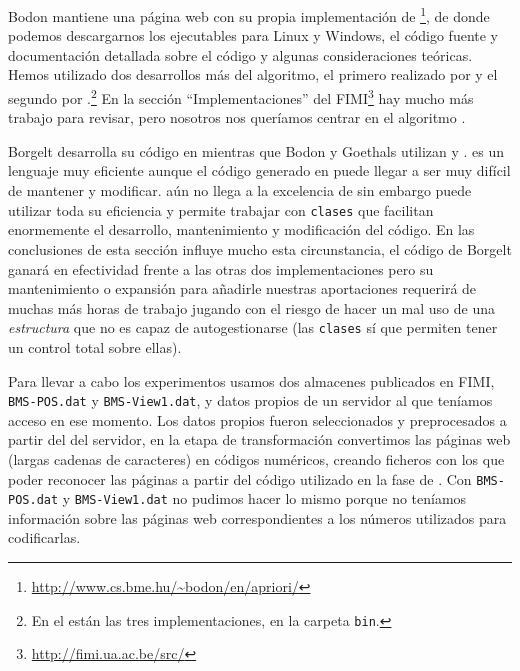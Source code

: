 Bodon mantiene una página web con su propia implementación de \apriori\footnote{\url{http://www.cs.bme.hu/~bodon/en/apriori/}}, de donde podemos descargarnos los ejecutables para Linux y Windows, el código fuente y documentación detallada sobre el código y algunas consideraciones teóricas. Hemos utilizado dos desarrollos más del algoritmo, el primero realizado por  y el segundo por .\footnote{En el \dvdAdjunto están las tres implementaciones, en la carpeta \texttt{bin}.} En la sección "`Implementaciones"' del FIMI\footnote{\url{http://fimi.ua.ac.be/src/}} hay mucho más trabajo para revisar, pero nosotros nos queríamos centrar en el algoritmo \apriori.

Borgelt desarrolla su código en \langC mientras que Bodon y Goethals utilizan \langC y \langCpp. \langC es un lenguaje muy eficiente aunque el código generado en \langC puede llegar a ser muy difícil de mantener y modificar. \langCpp aún no llega a la excelencia de \langC sin embargo puede utilizar toda su eficiencia y permite trabajar con \texttt{clases} que facilitan enormemente el desarrollo, mantenimiento y modificación del código. En las conclusiones de esta sección influye mucho esta circunstancia, el código de Borgelt ganará en efectividad frente a las otras dos implementaciones pero su mantenimiento o expansión para añadirle nuestras aportaciones requerirá de muchas más horas de trabajo jugando con el riesgo de hacer un mal uso de una \emph{estructura} que no es capaz de autogestionarse (las \texttt{clases} sí que permiten tener un control total sobre ellas).

Para llevar a cabo los experimentos usamos dos almacenes \D publicados en FIMI, \texttt{BMS-POS.dat} y \texttt{BMS-View1.dat}, y datos propios de un servidor al que teníamos acceso en ese momento. Los datos propios fueron seleccionados y preprocesados a partir del \flog del servidor, en la etapa de transformación convertimos las páginas web (largas cadenas de caracteres) en códigos numéricos, creando ficheros con los que poder reconocer las páginas a partir del código utilizado en la fase de \dm. Con \texttt{BMS-POS.dat} y \texttt{BMS-View1.dat} no pudimos hacer lo mismo porque no teníamos información sobre las páginas web correspondientes a los números utilizados para codificarlas.

